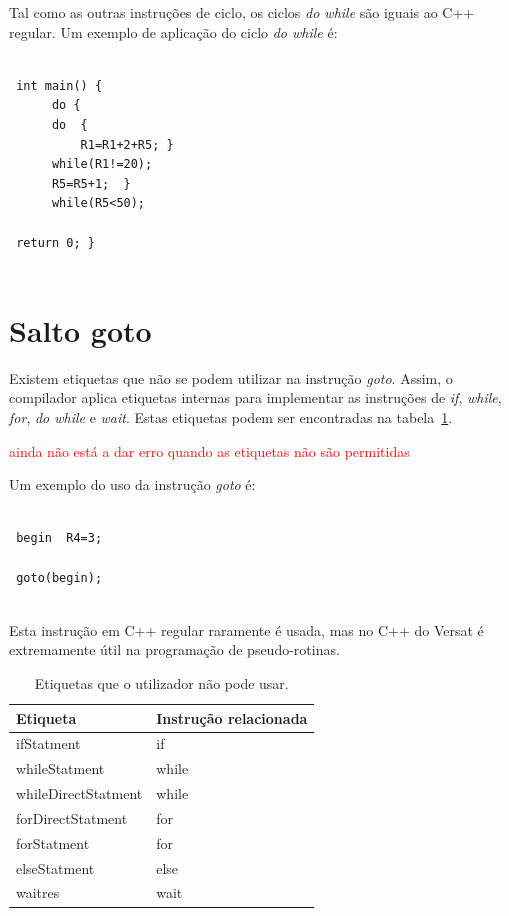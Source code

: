 Tal como as outras instruções de ciclo, os ciclos {\it do while} são iguais ao C++ regular. Um exemplo de aplicação do ciclo {\it do while} é:

\begin{lstlisting}
 
 int main() {
      do {
	  do  {
	      R1=R1+2+R5; }
	  while(R1!=20);
	  R5=R5+1;  }
      while(R5<50);
 
 return 0; }
 
\end{lstlisting}



\section{Salto goto}
\label{section:salto goto}


Existem etiquetas que não se podem utilizar na instrução {\it goto}. Assim, o compilador aplica etiquetas internas para implementar as instruções de {\it if}, {\it while}, {\it for}, {\it do while} e {\it wait}. 
Estas etiquetas podem ser encontradas na tabela~\ref{tab:labels}.




\textcolor{red}{ainda não está a dar erro quando as etiquetas não são permitidas}

Um exemplo do uso da instrução {\it goto} é:

\begin{lstlisting}
 
 begin	R4=3;

 goto(begin);
 
\end{lstlisting}

Esta instrução em C++ regular raramente é usada, mas no C++ do Versat é extremamente útil na programação de pseudo-rotinas.

\begin{table}[h!]
    \caption[Etiquetas que o utilizador não pode usar.]{Etiquetas que o utilizador não pode usar.}
  \begin{center}
    \begin{tabular}{|l|l|}
      \hline
       Etiqueta & Instrução relacionada  \\
      \hline \hline
      \cline{1-2}
      ifStatment  & if  \\
      \cline{1-2}
       whileStatment & while \\
       \cline{1-2}
       whileDirectStatment & while  \\
       \cline{1-2}
       forDirectStatment & for \\
       \cline{1-2}
       forStatment & for  \\
       \cline{1-2}
       elseStatment & else \\
       \cline{1-2}
       waitres & wait  \\
      
      \hline
    \end{tabular}
  \end{center}
  \label{tab:labels}
\end{table}


